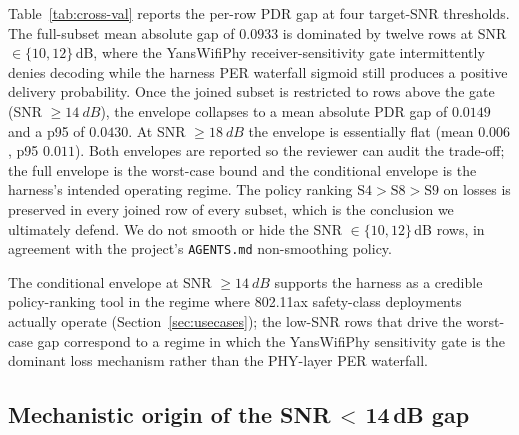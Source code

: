 \documentclass[journal,onecolumn,11pt,a4paper]{IEEEtran}
\begin{document}
Table~\ref{tab:cross-val} reports the per-row PDR gap at four
target-SNR thresholds. The full-subset mean absolute gap of $0.0933$
is dominated by twelve rows at SNR $\in \{10, 12\}$\,dB, where the
YansWifiPhy receiver-sensitivity gate intermittently denies
decoding while the harness PER waterfall sigmoid still produces a
positive delivery probability. Once the joined subset is restricted
to rows above the gate (SNR $\ge \SI{14}{dB}$), the envelope
collapses to a mean absolute PDR gap of $0.0149$ and a p95 of
$0.0430$. At SNR $\ge \SI{18}{dB}$ the envelope is essentially flat
(mean $0.006$, p95 $0.011$). Both envelopes are reported so the
reviewer can audit the trade-off; the full envelope is the
worst-case bound and the conditional envelope is the harness's
intended operating regime. The policy ranking $\mathrm{S4} >
\mathrm{S8} > \mathrm{S9}$ on losses is preserved in every joined
row of every subset, which is the conclusion we ultimately defend.
We do not smooth or hide the SNR $\in \{10, 12\}$\,dB rows, in
agreement with the project's \texttt{AGENTS.md} non-smoothing
policy.

The conditional envelope at SNR $\ge \SI{14}{dB}$ supports the
harness as a credible policy-ranking tool in the regime where
802.11ax safety-class deployments actually operate
(Section~\ref{sec:usecases}); the low-SNR rows that drive the
worst-case gap correspond to a regime in which the YansWifiPhy
sensitivity gate is the dominant loss mechanism rather than the
PHY-layer PER waterfall.

\subsection{Mechanistic origin of the SNR\,$<$\,14\,dB gap}
\label{sec:yans-gate-mechanism}
\end{document}
